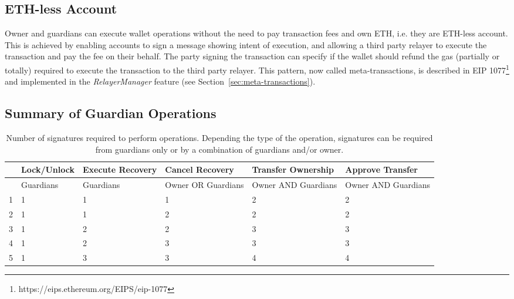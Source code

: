 \documentclass[12pt]{article}
\begin{document}
\subsection{ETH-less Account}
\label{sec:eth-less-account}

Owner and guardians can execute wallet operations without the need to pay transaction fees and own ETH, i.e. they are ETH-less account. This is achieved by enabling accounts to sign a message showing intent of execution, and allowing a third party relayer to execute the transaction and pay the fee on their behalf. The party signing the transaction can specify if the wallet should refund the gas (partially or totally) required to execute the transaction to the third party relayer. This pattern, now called meta-transactions, is described in EIP 1077\footnote{https://eips.ethereum.org/EIPS/eip-1077} and implemented in the \emph{RelayerManager} feature (see Section~\ref{sec:meta-transactions}). 

\subsection{Summary of Guardian Operations}
\begin{table}[ht]
    \begin{tabular}{ |c|m{6em}|m{6em}|m{6em}|m{6em}|m{6em}| }
     \hline
       & Lock/Unlock & Execute \newline Recovery & Cancel  \newline Recovery & Transfer Ownership & Approve Transfer \\
     \hline \hline
       & Guardians & Guardians & Owner OR Guardians & Owner AND Guardians & Owner AND Guardians \\
     \hline
     1 & 1 & 1 & 1 & 2 & 2 \\
     2 & 1 & 1 & 2 & 2 & 2 \\
     3 & 1 & 2 & 2 & 3 & 3 \\
     4 & 1 & 2 & 3 & 3 & 3 \\
     5 & 1 & 3 & 3 & 4 & 4 \\
     \hline

    \end{tabular}
    \caption{Number of signatures required to perform operations. Depending the type of the operation, signatures can be required from guardians only or by a combination of guardians and/or owner.}
\end{table}
\end{document}
